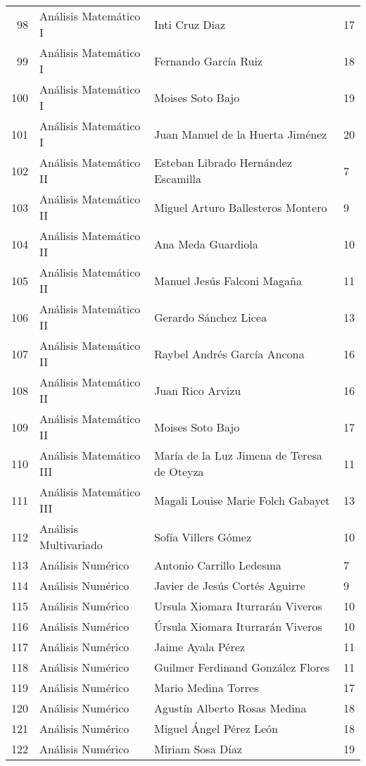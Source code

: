 \begin{table}[ht]
\begin{tabular}{rlll}
  98 & Análisis Matemático I & Inti Cruz Diaz & 17 \\ 
  99 & Análisis Matemático I & Fernando García Ruiz & 18 \\ 
  100 & Análisis Matemático I & Moises Soto Bajo & 19 \\ 
  101 & Análisis Matemático I & Juan Manuel de la Huerta Jiménez & 20 \\ 
  102 & Análisis Matemático II & Esteban Librado Hernández Escamilla & 7 \\ 
  103 & Análisis Matemático II & Miguel Arturo Ballesteros Montero & 9 \\ 
  104 & Análisis Matemático II & Ana Meda Guardiola & 10 \\ 
  105 & Análisis Matemático II & Manuel Jesús Falconi Magaña & 11 \\ 
  106 & Análisis Matemático II & Gerardo Sánchez Licea & 13 \\ 
  107 & Análisis Matemático II & Raybel Andrés García Ancona & 16 \\ 
  108 & Análisis Matemático II & Juan Rico Arvizu & 16 \\ 
  109 & Análisis Matemático II & Moises Soto Bajo & 17 \\ 
  110 & Análisis Matemático III & María de la Luz Jimena de Teresa de Oteyza & 11 \\ 
  111 & Análisis Matemático III & Magali Louise Marie Folch Gabayet & 13 \\ 
  112 & Análisis Multivariado & Sofía Villers Gómez & 10 \\ 
  113 & Análisis Numérico & Antonio Carrillo Ledesma & 7 \\ 
  114 & Análisis Numérico & Javier de Jesús Cortés Aguirre & 9 \\ 
  115 & Análisis Numérico & Ursula Xiomara Iturrarán Viveros & 10 \\ 
  116 & Análisis Numérico & Úrsula Xiomara Iturrarán Viveros & 10 \\ 
  117 & Análisis Numérico & Jaime Ayala Pérez & 11 \\ 
  118 & Análisis Numérico & Guilmer Ferdinand González Flores & 11 \\ 
  119 & Análisis Numérico & Mario Medina Torres & 17 \\ 
  120 & Análisis Numérico & Agustín Alberto Rosas Medina & 18 \\ 
  121 & Análisis Numérico & Miguel Ángel Pérez León & 18 \\ 
  122 & Análisis Numérico & Miriam Sosa Díaz & 19 \\ 

\end{tabular}
\end{table}
